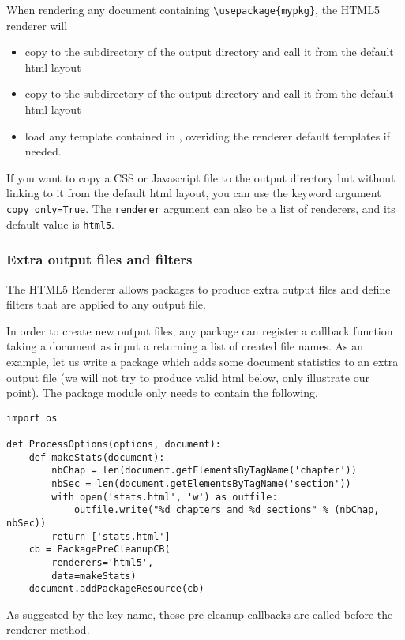 When rendering any document containing \verb+\usepackage{mypkg}+,
the HTML5 renderer will
\begin{itemize}
\item
    copy 
    to the  subdirectory of the output directory
    and call it from the default html layout
\item
    copy 
    to the  subdirectory of the output directory
    and call it from the default html layout
\item
    load any template contained in , overiding the renderer default templates if needed.
\end{itemize}

If you want to copy a CSS or Javascript file to the output directory but
without linking to it from the default html layout, you can
use the keyword argument \verb+copy_only=True+.
The \verb+renderer+ argument can also be a list of renderers, and
its default value is \verb+html5+.

\subsubsection*{Extra output files and filters}

The HTML5 Renderer allows packages to produce extra output files and
define filters that are applied to any output file.

In order to create new output files, any package can register a callback
function taking a document as input a returning a list of created file
names. As an example, let us write a package which adds some document
statistics to an extra output file  (we will not try to
produce valid html below, only illustrate our point). The package module
only needs to contain the following.
\begin{verbatim}
import os

def ProcessOptions(options, document):
    def makeStats(document):
        nbChap = len(document.getElementsByTagName('chapter'))
        nbSec = len(document.getElementsByTagName('section'))
        with open('stats.html', 'w') as outfile:
            outfile.write("%d chapters and %d sections" % (nbChap, nbSec))
        return ['stats.html']
    cb = PackagePreCleanupCB(
        renderers='html5',
        data=makeStats)
    document.addPackageResource(cb)
\end{verbatim}

As suggested by the key name, those pre-cleanup callbacks are called before
the renderer  method.

